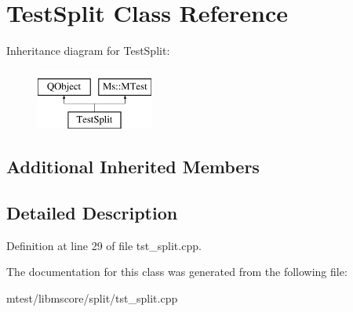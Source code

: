 \hypertarget{class_test_split}{}\section{Test\+Split Class Reference}
\label{class_test_split}
Inheritance diagram for Test\+Split\+:\begin{figure}[H]
\begin{center}
\leavevmode
\includegraphics[height=2.000000cm]{class_test_split}
\end{center}
\end{figure}
\subsection*{Additional Inherited Members}


\subsection{Detailed Description}


Definition at line 29 of file tst\+\_\+split.\+cpp.



The documentation for this class was generated from the following file\+:\begin{DoxyCompactItemize}
\item 
mtest/libmscore/split/tst\+\_\+split.\+cpp\end{DoxyCompactItemize}
